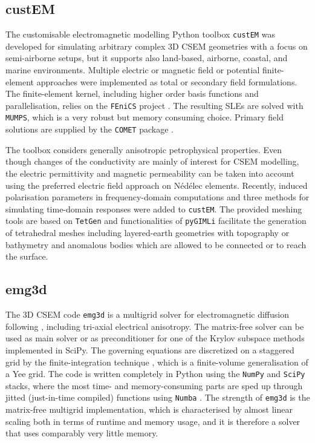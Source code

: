 \documentclass[a4paper, extra, camera,%
]{gji}
\newcommand{\custem}{\texttt{custEM}\xspace}
\begin{document}
\subsection{custEM}

The customisable electromagnetic modelling Python toolbox \custem was developed for simulating arbitrary complex 3D CSEM geometries with a focus on semi-airborne setups, but it supports also land-based, airborne, coastal, and marine environments. Multiple electric or magnetic field or potential finite-element approaches were implemented as total or secondary field formulations. The finite-element kernel, including higher order basis functions and parallelisation, relies on the \texttt{FEniCS} project \citep{B.SPR.12.Logg, B.SPR.16.Langtangen}. The resulting SLEs are solved with \texttt{MUMPS}, which is a very robust but memory consuming choice. Primary field solutions are supplied by the \texttt{COMET} package \citep{GEO.20.Skibbe}.

The toolbox considers generally anisotropic petrophysical properties. Even though changes of the conductivity are mainly of interest for CSEM modelling, the electric permittivity and magnetic permeability can be taken into account using the preferred electric field approach on Nédélec elements. Recently, induced polarisation parameters in frequency-domain computations and three methods for simulating time-domain responses were added to \custem. The provided meshing tools are based on \texttt{TetGen} \citep{TOM.15.Si} and functionalities of \texttt{pyGIMLi} facilitate the generation of tetrahedral meshes including layered-earth geometries with topography or bathymetry and anomalous bodies which are allowed to be connected or to reach the surface.

\subsection{emg3d}

The 3D CSEM code \texttt{emg3d} is a multigrid solver \citep{CMMP.64.Fedorenko} for electromagnetic diffusion following \cite{GP.06.Mulder}, including tri-axial electrical anisotropy. The matrix-free solver can be used as main solver or as preconditioner for one of the Krylov subspace methods implemented in SciPy. The governing equations are discretized on a staggered grid by the finite-integration technique \citep{AEU.77.Weiland}, which is a finite-volume generalisation of a Yee grid. The code is written completely in Python using the \texttt{NumPy} and \texttt{SciPy} stacks, where the most time- and memory-consuming parts are sped up through jitted (just-in-time compiled) functions using \texttt{Numba} \citep{LLVM.15.Lam}. The strength of \texttt{emg3d} is the matrix-free multigrid implementation, which is characterised by almost linear scaling both in terms of runtime and memory usage, and it is therefore a solver that uses comparably very little memory.
\end{document}
